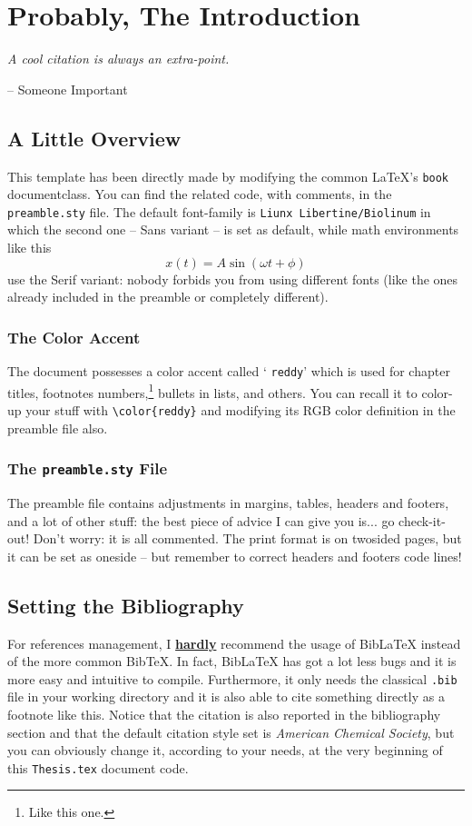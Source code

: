 \documentclass[12pt,a4paper,twoside]{book}
\begin{document}
	\chapter{Probably, The Introduction} 
	\epigraph{\it A cool citation is always an extra-point.}{-- Someone Important}
	\minitoc
\section{A Little Overview}
This template has been directly made by modifying the common \LaTeX 's {\color{reddy} \verb|book|} documentclass. You can find the related code, with comments, in the {\color{reddy} \verb|preamble.sty|} file. The default font-family is {\color{reddy} \verb|Liunx Libertine/Biolinum|} in which the second one -- Sans variant -- is set as default, while math environments like this
$$x(t)=A\sin(\omega t + \phi)$$
use the Serif variant: nobody forbids you from using different fonts (like the ones already included in the preamble or completely different).
\subsection{The Color Accent}
The document possesses a color accent called ‘{\color{reddy} \verb|reddy|}’ which is used for chapter titles, footnotes numbers,\footnote{Like this one.} bullets in lists, and others. You can recall it to color-up your stuff with {\color{reddy} \verb|\color{reddy}|} and modifying its RGB color definition in the preamble file also.

\subsection{The \texttt{preamble.sty} File}
The preamble file contains adjustments in margins, tables, headers and footers, and a lot of other stuff: the best piece of advice I can give you is... {\color{reddy} go check-it-out}! Don't worry: it is all commented. The print format is on twosided pages, but it can be set as oneside -- but remember to correct headers and footers code lines!

\section{Setting the Bibliography}
For references management, I \underline{\color{reddy} \bf hardly} recommend the usage of {\color{reddy} Bib\LaTeX}  instead of the more common Bib\TeX . In fact, {\color{reddy} Bib\LaTeX} has got a lot less bugs and it is more easy and intuitive to compile. Furthermore, it only needs the classical \verb|.bib| file in your working directory and it is also able to cite something directly as a footnote like this. Notice that the citation is also reported in the bibliography section and that the default citation style set is \textit{American Chemical Society}, but you can obviously change it, according to your needs, at the very beginning of this {\color{reddy} \verb|Thesis.tex|} document code.
\end{document}
